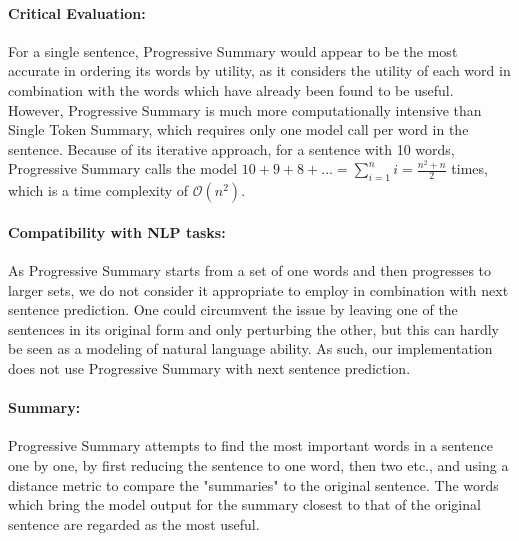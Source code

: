 \paragraph{Critical Evaluation:}
For a single sentence, Progressive Summary would appear to be the most accurate in ordering its words by utility, as it considers the utility of each word in combination with the words which have already been found to be useful.
However, Progressive Summary is much more computationally intensive than Single Token Summary, which requires only one model call per word in the sentence.
Because of its iterative approach, for a sentence with 10 words, Progressive Summary calls the model $10+9+8+... = \sum_{i=1}^{n}i = \frac{n^2 + n}{2}$ times, which is a time complexity of $\mathcal{O}(n^2)$.

\paragraph{Compatibility with NLP tasks:}
As Progressive Summary starts from a set of one words and then progresses to larger sets, we do not consider it appropriate to employ in combination with next sentence prediction.
One could circumvent the issue by leaving one of the sentences in its original form and only perturbing the other, but this can hardly be seen as a modeling of natural language ability.
As such, our implementation does not use Progressive Summary with next sentence prediction.

\paragraph{Summary:}
Progressive Summary attempts to find the most important words in a sentence one by one, by first reducing the sentence to one word, then two etc., and using a distance metric to compare the "summaries" to the original sentence.
The words which bring the model output for the summary closest to that of the original sentence are regarded as the most useful.

